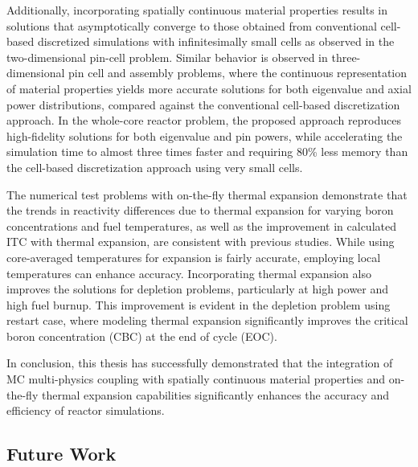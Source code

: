 Additionally, incorporating spatially continuous material properties results in solutions that asymptotically converge to those obtained from conventional cell-based discretized simulations with infinitesimally small cells as observed in the two-dimensional pin-cell problem. Similar behavior is observed in three-dimensional pin cell and assembly problems, where the continuous representation of material properties yields more accurate solutions for both eigenvalue and axial power distributions, compared against the conventional cell-based discretization approach. In the whole-core reactor problem, the proposed approach reproduces high-fidelity solutions for both eigenvalue and pin powers, while accelerating the simulation time to almost three times faster and requiring 80\% less memory than the cell-based discretization approach using very small cells.

The numerical test problems with on-the-fly thermal expansion demonstrate that the trends in reactivity differences due to thermal expansion for varying boron concentrations and fuel temperatures, as well as the improvement in calculated ITC with thermal expansion, are consistent with previous studies. While using core-averaged temperatures for expansion is fairly accurate, employing local temperatures can enhance accuracy. Incorporating thermal expansion also improves the solutions for depletion problems, particularly at high power and high fuel burnup. This improvement is evident in the depletion problem using restart case, where modeling thermal expansion significantly improves the critical boron concentration (CBC) at the end of cycle (EOC).

In conclusion, this thesis has successfully demonstrated that the integration of MC multi-physics coupling with spatially continuous material properties and on-the-fly thermal expansion capabilities significantly enhances the accuracy and efficiency of reactor simulations.

\subsection{Future Work}

